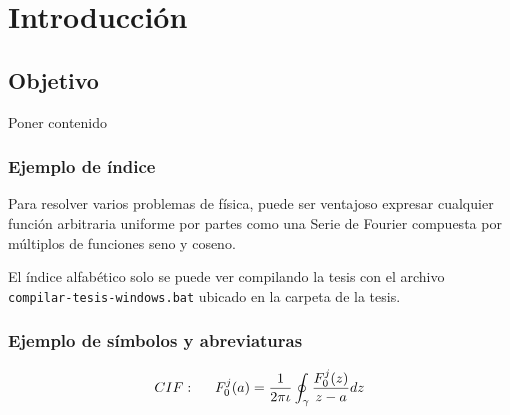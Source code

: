 \chapter{Introducción}

\section{Objetivo}

Poner contenido

\subsection{Ejemplo de índice}

Para resolver varios problemas de física, puede ser ventajoso expresar cualquier función arbitraria uniforme por partes como una Serie de Fourier  compuesta por múltiplos de funciones seno y coseno.

El índice alfabético solo se puede ver compilando la tesis con el archivo \linebreak \verb|compilar-tesis-windows.bat| ubicado en la carpeta de la tesis.

\subsection{Ejemplo de símbolos y abreviaturas}
\begin{align}
CIF: \hspace*{5mm}F_0^j(a) = \frac{1}{2\pi \iota} \oint_{\gamma} \frac{F_0^j(z)}{z - a} dz
\end{align}

\nomenclature[g-p]{$\pi$}{ $\simeq 3.14\ldots$}                                             %

